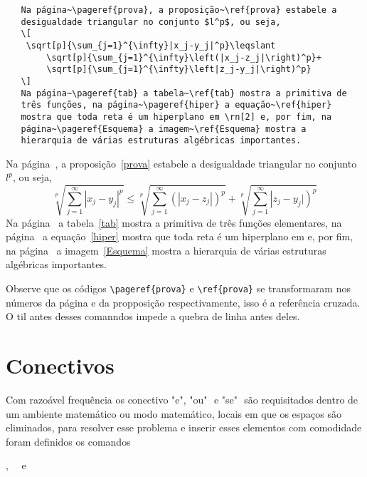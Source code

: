 \begin{tcolorbox}[title={Exemplo de referência cruzada}]
   \begin{lstlisting}
   Na página~\pageref{prova}, a proposição~\ref{prova} estabele a 
   desigualdade triangular no conjunto $l^p$, ou seja,
   \[
    \sqrt[p]{\sum_{j=1}^{\infty}|x_j-y_j|^p}\leqslant
        \sqrt[p]{\sum_{j=1}^{\infty}\left(|x_j-z_j|\right)^p}+
        \sqrt[p]{\sum_{j=1}^{\infty}\left|z_j-y_j|\right)^p}
   \]
   Na página~\pageref{tab} a tabela~\ref{tab} mostra a primitiva de 
   três funções, na página~\pageref{hiper} a equação~\ref{hiper} 
   mostra que toda reta é um hiperplano em \rn[2] e, por fim, na 
   página~\pageref{Esquema} a imagem~\ref{Esquema} mostra a 
   hierarquia de várias estruturas algébricas importantes. 
   \end{lstlisting}
   
   \tcblower
   
   Na página~\pageref{prova}, a proposição~\ref{prova} estabele a desigualdade 
   triangular no conjunto $l^p$, ou seja,
   \[
    \sqrt[p]{\sum_{j=1}^{\infty}|x_j-y_j|^p}\leqslant
        \sqrt[p]{\sum_{j=1}^{\infty}\left(|x_j-z_j|\right)^p}+
        \sqrt[p]{\sum_{j=1}^{\infty}\left|z_j-y_j|\right)^p}
   \]
   Na página~\pageref{tab} a tabela~\ref{tab} mostra a primitiva de três 
   funções elementares, na página~\pageref{hiper} a equação~\ref{hiper} 
   mostra que toda reta é um hiperplano em \rn[2] e, por fim, na 
   página~\pageref{Esquema} a imagem~\ref{Esquema} mostra 
   a hierarquia de várias estruturas algébricas importantes.
\end{tcolorbox}

Observe que os códigos \verb|\pageref{prova}| e \verb|\ref{prova}| se transformaram 
nos números da página e da propposição respectivamente, isso é a referência cruzada.
O til antes desses comanndos impede a quebra de linha antes deles.

\section{Conectivos}

Com razoável frequência os conectivo "e", "ou"\,\, e "se"\,\, são
requisitados dentro de um ambiente matemático ou modo matemático,
locais em que os espaços são eliminados, para resolver esse problema e inserir
esses elementos com comodidade foram definidos os comandos
\begin{center}
	,\,\, \,\, e\,\, 
\end{center}

